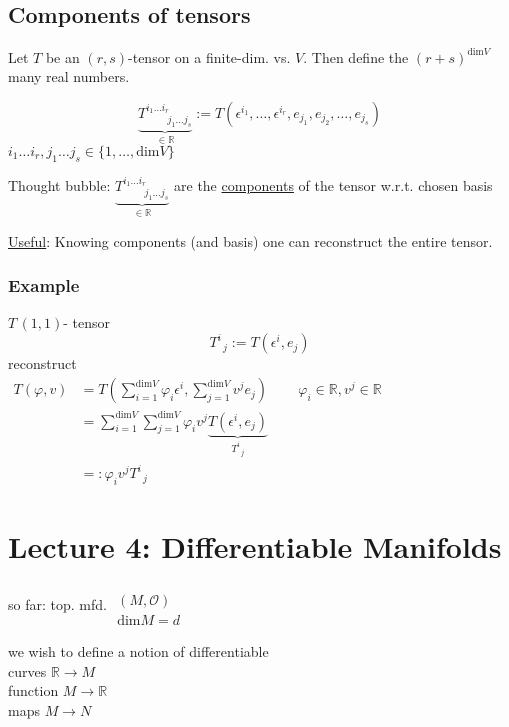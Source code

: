\documentclass[10pt]{amsart}
\begin{document}
\begin{multicols*}{2}
\subsection{Components of tensors}

Let $T$ be an $(r,s)$-tensor on a finite-dim. vs. $V$.  Then define the $(r+s)^{\text{dim}V}$ many real numbers.  

\[
\underbrace{T^{i_1 \dots i_r}_{ \qquad \, j_1 \dots j_s} }_{\in \mathbb{R}} := T(\epsilon^{i_1}, \dots , \epsilon^{i_r} , e_{j_1} , e_{j_2}, \dots, e_{j_s} )
\]
$i_1 \dots i_r, j_1 \dots j_s \in \lbrace 1 , \dots , \text{dim}V \rbrace$

Thought bubble: $\underbrace{T^{i_1 \dots i_r}_{ \qquad \, j_1 \dots j_s} }_{\in \mathbb{R}}$ are the \underline{components} of the tensor w.r.t. chosen basis

\underline{Useful}: Knowing components (and basis) one can reconstruct the entire tensor.

\subsubsection*{Example} $T \, (1,1)$- tensor
\[
T^i_{ \; \; j} := T(\epsilon^i, e_j)
\]
reconstruct \\
$\begin{aligned} 
T(\varphi,v) & =T(\sum_{i=1}^{\text{dim}{V}}\varphi_i \epsilon^i, \sum_{j=1}^{\text{dim}V} v^j e_j)   \qquad \, \varphi_i \in \mathbb{R}, v^j \in \mathbb{R} \\ 
&  = \sum_{i=1}^{\text{dim}V} \sum_{j=1}^{\text{dim}{V}} \varphi_i v^j \underbrace{ T(\epsilon^i, e_j) }_{T^i_{ \; \; j}} \\
& =: \varphi_i v^j T^i_{ \; \; j}
\end{aligned}$







\section{Lecture 4: Differentiable Manifolds}

so far: top. mfd. $\begin{gathered}  \quad \\ 
(M,\mathcal{O}) \\
\text{dim}M = d \end{gathered}$

we wish to define a notion of differentiable  \\
\phantom{ \quad \quad \, } curves $\mathbb{R} \to M$ \\
\phantom{ \quad \quad \, } function $M \to \mathbb{R}$ \\
\phantom{ \quad \quad \, } maps $M \to N$


\end{multicols*}
\end{document}
